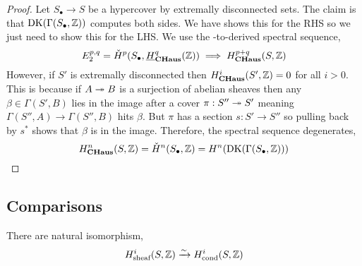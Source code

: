 \documentclass[12pt]{article}
\newcommand{\cond}{\text{cond}}
\newcommand{\sheaf}{\text{sheaf}}
\newcommand{\DK}{\mathrm{DK}}
\renewcommand{\Cech}{\text{\v{C}ech}\xspace}
\begin{document}
\begin{proof}
Let $S_\bullet \to S$ be a hypercover by extremally disconnected sets. The claim is that $\DK(\Gamma(S_\bullet, \Z))$ computes both sides. We have shows this for the RHS so we just need to show this for the LHS. We use the \Cech-to-derived spectral sequence,
\[ E^{p,q}_2 = \check{H}^p(S_\bullet, \underline{H}_{\mathbf{CHaus}}^q(\mathbb{Z})) \implies H^{p+q}_{\mathbf{CHaus}}(S, \mathbb{Z}) \]
However, if $S'$ is extremally disconnected then $H^i_{\mathbf{CHaus}}(S', \mathbb{Z}) = 0$ for all $i > 0$. This is because if $A \twoheadrightarrow B$ is a surjection of abelian sheaves then any $\beta \in \Gamma(S', B)$ lies in the image after a cover $\pi : S'' \twoheadrightarrow S'$ meaning $\Gamma(S'', A) \to \Gamma(S'', B)$ hits $\beta$. But $\pi$ has a section $s : S' \to S''$ so pulling back by $s^*$ shows that $\beta$ is in the image. Therefore, the spectral sequence degenerates,
\[ H^n_{\CHaus}(S, \Z) = \check{H}^n(S_\bullet, \Z) = H^n(\DK(\Gamma(S_\bullet, \Z))) \]
\end{proof}

\subsection{Comparisons}

\begin{theorem}
There are natural isomorphism,
\[ H^i_{\sheaf}(S, \Z) \iso H^i_{\cond}(S, \Z) \]
\end{theorem}
\end{document}
